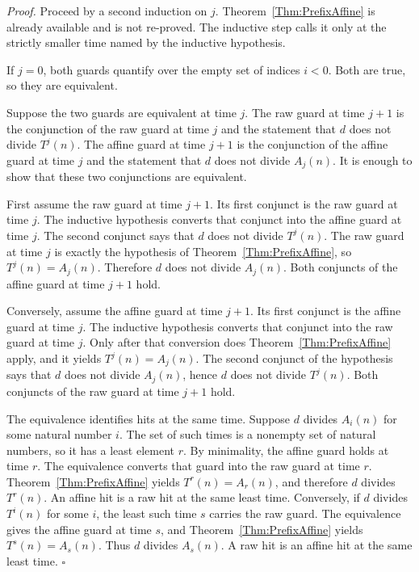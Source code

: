 \documentclass[11pt,letterpaper]{article}
\newenvironment{proof}{\noindent\textit{Proof.}}{\hfill\(\square\)}
\begin{document}
\begin{proof}
Proceed by a second induction on \(j\). Theorem~\ref{Thm:PrefixAffine} is already available and is not re-proved. The inductive step calls it only at the strictly smaller time named by the inductive hypothesis.

If \(j=0\), both guards quantify over the empty set of indices \(i<0\). Both are true, so they are equivalent.

Suppose the two guards are equivalent at time \(j\). The raw guard at time \(j+1\) is the conjunction of the raw guard at time \(j\) and the statement that \(d\) does not divide \(T^{j}(n)\). The affine guard at time \(j+1\) is the conjunction of the affine guard at time \(j\) and the statement that \(d\) does not divide \(A_{j}(n)\). It is enough to show that these two conjunctions are equivalent.

First assume the raw guard at time \(j+1\). Its first conjunct is the raw guard at time \(j\). The inductive hypothesis converts that conjunct into the affine guard at time \(j\). The second conjunct says that \(d\) does not divide \(T^{j}(n)\). The raw guard at time \(j\) is exactly the hypothesis of Theorem~\ref{Thm:PrefixAffine}, so \(T^{j}(n)=A_{j}(n)\). Therefore \(d\) does not divide \(A_{j}(n)\). Both conjuncts of the affine guard at time \(j+1\) hold.

Conversely, assume the affine guard at time \(j+1\). Its first conjunct is the affine guard at time \(j\). The inductive hypothesis converts that conjunct into the raw guard at time \(j\). Only after that conversion does Theorem~\ref{Thm:PrefixAffine} apply, and it yields \(T^{j}(n)=A_{j}(n)\). The second conjunct of the hypothesis says that \(d\) does not divide \(A_{j}(n)\), hence \(d\) does not divide \(T^{j}(n)\). Both conjuncts of the raw guard at time \(j+1\) hold.

The equivalence identifies hits at the same time. Suppose \(d\) divides \(A_{i}(n)\) for some natural number \(i\). The set of such times is a nonempty set of natural numbers, so it has a least element \(r\). By minimality, the affine guard holds at time \(r\). The equivalence converts that guard into the raw guard at time \(r\). Theorem~\ref{Thm:PrefixAffine} yields \(T^{r}(n)=A_{r}(n)\), and therefore \(d\) divides \(T^{r}(n)\). An affine hit is a raw hit at the same least time. Conversely, if \(d\) divides \(T^{i}(n)\) for some \(i\), the least such time \(s\) carries the raw guard. The equivalence gives the affine guard at time \(s\), and Theorem~\ref{Thm:PrefixAffine} yields \(T^{s}(n)=A_{s}(n)\). Thus \(d\) divides \(A_{s}(n)\). A raw hit is an affine hit at the same least time.
\end{proof}
\end{document}
